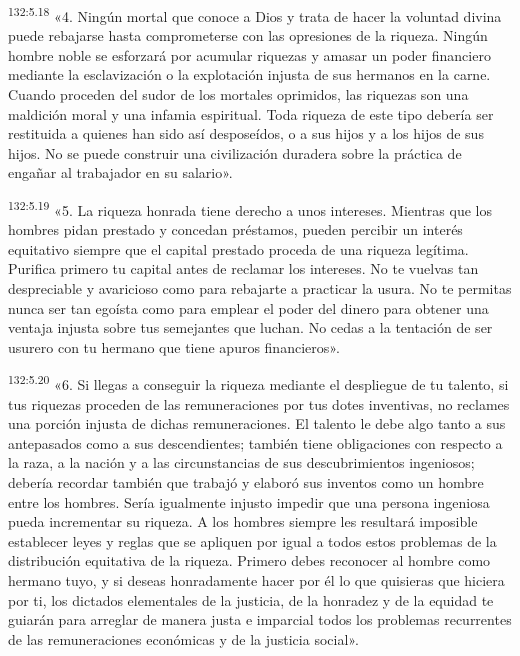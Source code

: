 \par 
\textsuperscript{132:5.18} «4. Ningún mortal que conoce a Dios y trata de hacer la voluntad divina puede rebajarse hasta comprometerse con las opresiones de la riqueza. Ningún hombre noble se esforzará por acumular riquezas y amasar un poder financiero mediante la esclavización o la explotación injusta de sus hermanos en la carne. Cuando proceden del sudor de los mortales oprimidos, las riquezas son una maldición moral y una infamia espiritual. Toda riqueza de este tipo debería ser restituida a quienes han sido así desposeídos, o a sus hijos y a los hijos de sus hijos. No se puede construir una civilización duradera sobre la práctica de engañar al trabajador en su salario».

\par 
\textsuperscript{132:5.19} «5. La riqueza honrada tiene derecho a unos intereses. Mientras que los hombres pidan prestado y concedan préstamos, pueden percibir un interés equitativo siempre que el capital prestado proceda de una riqueza legítima. Purifica primero tu capital antes de reclamar los intereses. No te vuelvas tan despreciable y avaricioso como para rebajarte a practicar la usura. No te permitas nunca ser tan egoísta como para emplear el poder del dinero para obtener una ventaja injusta sobre tus semejantes que luchan. No cedas a la tentación de ser usurero con tu hermano que tiene apuros financieros».

\par 
\textsuperscript{132:5.20} «6. Si llegas a conseguir la riqueza mediante el despliegue de tu talento, si tus riquezas proceden de las remuneraciones por tus dotes inventivas, no reclames una porción injusta de dichas remuneraciones. El talento le debe algo tanto a sus antepasados como a sus descendientes; también tiene obligaciones con respecto a la raza, a la nación y a las circunstancias de sus descubrimientos ingeniosos; debería recordar también que trabajó y elaboró sus inventos como un hombre entre los hombres. Sería igualmente injusto impedir que una persona ingeniosa pueda incrementar su riqueza. A los hombres siempre les resultará imposible establecer leyes y reglas que se apliquen por igual a todos estos problemas de la distribución equitativa de la riqueza. Primero debes reconocer al hombre como hermano tuyo, y si deseas honradamente hacer por él lo que quisieras que hiciera por ti, los dictados elementales de la justicia, de la honradez y de la equidad te guiarán para arreglar de manera justa e imparcial todos los problemas recurrentes de las remuneraciones económicas y de la justicia social».

